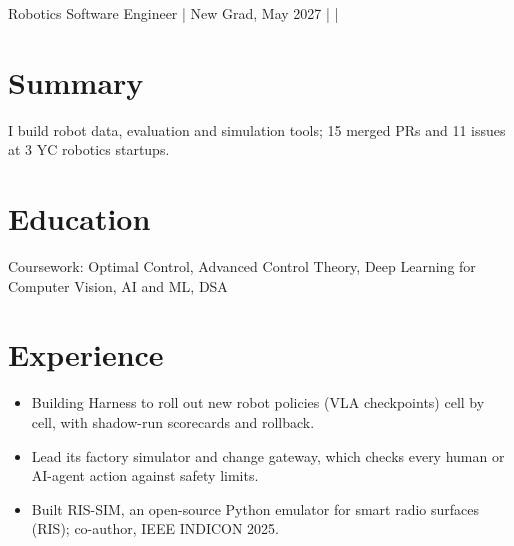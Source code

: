 \documentclass[10pt]{article}
\begin{document}
{Robotics Software Engineer | New Grad, May 2027}
{ |  | }

\section{Summary}
I build robot data, evaluation and simulation tools; 15 merged PRs and 11 issues at 3 YC robotics startups.

\section{Education}
Coursework: Optimal Control, Advanced Control Theory, Deep Learning for Computer Vision, AI and ML, DSA\par

\section{Experience}
\begin{itemize}
\item Building Harness to roll out new robot policies (VLA checkpoints) cell by cell, with shadow-run scorecards and rollback.
\item Lead its factory simulator and change gateway, which checks every human or AI-agent action against safety limits.
\end{itemize}
\begin{itemize}
\item Built RIS-SIM, an open-source Python emulator for smart radio surfaces (RIS); co-author, IEEE INDICON 2025.
\end{itemize}
\end{document}

